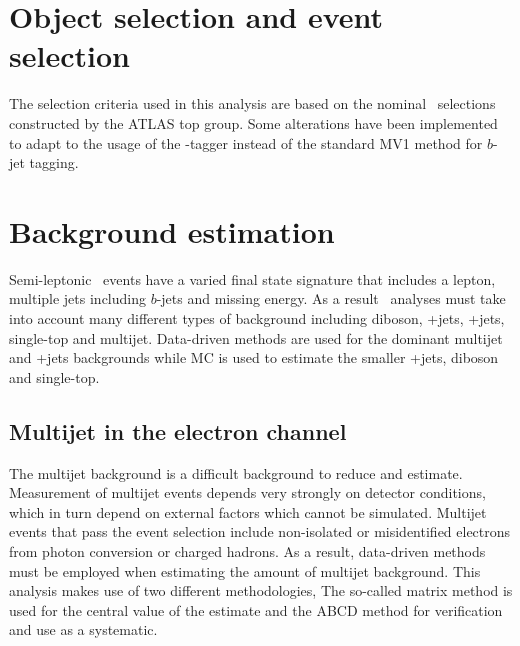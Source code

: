 \section{Object selection and event selection} \label{sec:CrossSectionEventSelection}
The selection criteria used in this analysis are based on the nominal \cmsS\ selections constructed by the ATLAS top group. Some alterations have been implemented to adapt to the usage of the \xsm-tagger instead of the standard MV1 method for $b$-jet tagging. 

\section{Background estimation} \label{sec:CrossSectionBacgkround}

Semi-leptonic \ttbar\ events have a varied final state signature that includes a lepton, multiple jets including $b$-jets and missing energy. As a result \ttbar\ analyses must take into account many different types of background including diboson, \W+jets, \Z+jets, single-top and multijet. Data-driven methods are used for the dominant multijet and \W+jets backgrounds while MC is used to estimate the smaller \Z+jets, diboson and single-top.

\subsection{Multijet in the electron channel}
The multijet background is a difficult background to reduce and estimate. Measurement of multijet events depends very strongly on detector conditions, which in turn depend on external factors which cannot be simulated. Multijet events that pass the event selection include non-isolated or misidentified electrons from photon conversion or charged hadrons. As a result, data-driven methods must be employed when estimating the amount of multijet background. This analysis makes use of two different methodologies, The so-called matrix method is used for the central value of the estimate and the ABCD method for verification and use as a systematic.

